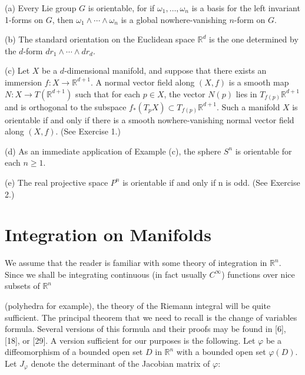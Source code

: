 \begin{examples}\label{thm:4.3}
(a) Every Lie group $G$ is orientable, for if $\omega_1, \ldots, \omega_n$ is a basis for the left invariant 1-forms on $G$, then $\omega_1 \wedge \cdots \wedge \omega_n$ is a global nowhere-vanishing $n$-form on $G$.

(b) The standard orientation on the Euclidean space  $ \mathbb{R}^d $ is the one determined by the  $ d $-form  $ dr_1 \wedge \cdots \wedge dr_d $.

(c) Let $X$ be a $d$-dimensional manifold, and suppose that there exists an immersion $f: X \to \mathbb{R}^{d+1}$. A normal vector field along $(X, f)$ is a smooth map $N: X \to T(\mathbb{R}^{d+1})$ such that for each $p \in X$, the vector $N(p)$ lies in $T_{f(p)}\mathbb{R}^{d+1}$ and is orthogonal to the subspace $f_{*}(T_p X) \subset T_{f(p)}\mathbb{R}^{d+1}$. Such a manifold $X$ is orientable if and only if there is a smooth nowhere-vanishing normal vector field along $(X, f)$. (See Exercise 1.)

(d) As an immediate application of Example (c), the sphere $S^{n}$ is orientable for each  $ n \geq 1 $.

(e) The real projective space  $ P^n $ is orientable if and only if n is odd. (See Exercise 2.)

\end{examples}

\section{Integration on Manifolds}


\label{thm:4.4}
We assume that the reader is familiar with some theory of integration in  $ \mathbb{R}^n $. Since we shall be integrating continuous (in fact usually  $ C^\infty $) functions over nice subsets of  $ \mathbb{R}^n $ 

(polyhedra for example), the theory of the Riemann integral will be quite sufficient. The principal theorem that we need to recall is the change of variables formula. Several versions of this formula and their proofs may be found in [6], [18], or [29]. A version sufficient for our purposes is the following. Let $\varphi$ be a diffeomorphism of a bounded open set $D$ in $\mathbb{R}^{n}$ with a bounded open set $\varphi(D)$. Let $J_{\varphi}$ denote the determinant of the Jacobian matrix of $\varphi$:

